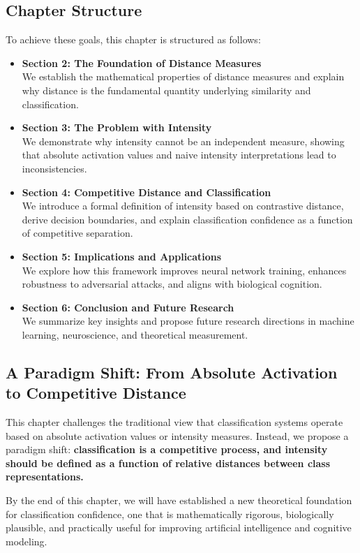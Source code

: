 \subsection{Chapter Structure}

To achieve these goals, this chapter is structured as follows:

\begin{itemize}
    \item \textbf{Section 2: The Foundation of Distance Measures} \\
    We establish the mathematical properties of distance measures and explain why distance is the fundamental quantity underlying similarity and classification.
    \item \textbf{Section 3: The Problem with Intensity} \\
    We demonstrate why intensity cannot be an independent measure, showing that absolute activation values and naive intensity interpretations lead to inconsistencies.
    \item \textbf{Section 4: Competitive Distance and Classification} \\
    We introduce a formal definition of intensity based on contrastive distance, derive decision boundaries, and explain classification confidence as a function of competitive separation.
    \item \textbf{Section 5: Implications and Applications} \\
    We explore how this framework improves neural network training, enhances robustness to adversarial attacks, and aligns with biological cognition.
    \item \textbf{Section 6: Conclusion and Future Research} \\
    We summarize key insights and propose future research directions in machine learning, neuroscience, and theoretical measurement.
\end{itemize}

\subsection{A Paradigm Shift: From Absolute Activation to Competitive Distance}

This chapter challenges the traditional view that classification systems operate based on absolute activation values or intensity measures. Instead, we propose a paradigm shift: \textbf{classification is a competitive process, and intensity should be defined as a function of relative distances between class representations.}

By the end of this chapter, we will have established a new theoretical foundation for classification confidence, one that is mathematically rigorous, biologically plausible, and practically useful for improving artificial intelligence and cognitive modeling.
